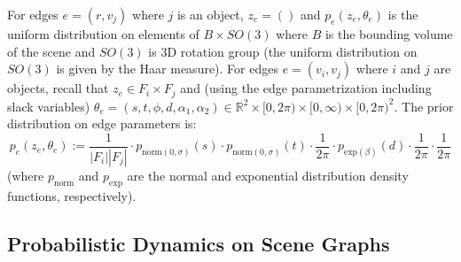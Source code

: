 For edges $e = (r, v_j)$ where $j$ is an object, $z_e = ()$ and $p_e(z_e, \theta_e)$ is the uniform distribution on elements of $B \times SO(3)$ where $B$ is the bounding volume of the scene and $SO(3)$ is 3D rotation group (the uniform distribution on $SO(3)$ is given by the Haar measure).
For edges $e = (v_i, v_j)$ where $i$ and $j$ are objects, recall that $z_e \in F_i \times F_j$ and (using the edge parametrization including slack variables) $\theta_e = (s, t, \phi, d, \alpha_1, \alpha_2) \in \mathbb{R}^2 \times [0, 2 \pi) \times [0, \infty) \times [0, 2 \pi)^2$.
The prior distribution on edge parameters is:
\begin{equation}
    p_e(z_e, \theta_e) := \frac{1}{|F_i| |F_j|}
    \cdot p_{\mathrm{norm}(0, \sigma)}(s) \cdot p_{\mathrm{norm}(0, \sigma)}(t)
    \cdot \frac{1}{2 \pi}
    \cdot p_{\mathrm{exp}(\beta)}(d)
    \cdot \frac{1}{2 \pi}
    \cdot \frac{1}{2 \pi}
\end{equation}
(where $p_{\mathrm{norm}}$ and $p_{\mathrm{exp}}$ are the normal and exponential distribution density functions, respectively).

\subsection{Probabilistic Dynamics on Scene Graphs}

